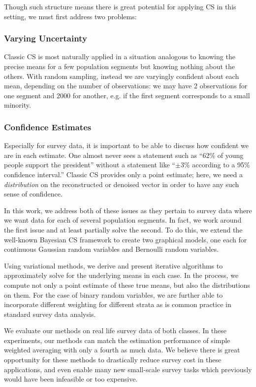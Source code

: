 Though such structure means there is great potential for applying CS in this setting, we must first address two problems:
\subsubsection{Varying Uncertainty}
Classic CS is most naturally applied in a situation analogous to knowing the precise means for a few population segments but knowing nothing about the others. With random sampling, instead we are varyingly confident about each mean, depending on the number of observations: we may have 2 observations for one segment and 2000 for another, e.g. if the first segment corresponds to a small minority.

\subsubsection{Confidence Estimates}
Especially for survey data, it is important to be able to discuss how confident we are in each estimate. One almost never sees a statement such as ``62\% of young people support the president'' without a statement like ``$\pm 3\%$ according to a 95\% confidence interval.'' Classic CS provides only a point estimate; here, we need a \emph{distribution} on the reconstructed or denoised vector in order to have any such sense of confidence.

In this work, we address both of these issues as they pertain to survey data where we want data for each of several population segments.
In fact, we work around the first issue and at least partially solve the second. 
To do this, we extend the well-known Bayesian CS framework \cite{ji2008bcs} to create two graphical models, one each for continuous Gaussian random variables and Bernoulli random variables.

Using variational methods, we derive and present iterative algorithms to approximately solve for the underlying means in each case.
In the process, we compute not only a point estimate of these true means, but also the distributions on them.
For the case of binary random variables, we are further able to incorporate different weighting for different strata as is common practice in standard survey data analysis.

We evaluate our methods on real life survey data of both classes.
In these experiments, our methods can match the estimation performance of simple weighted averaging with only a fourth as much data.
We believe there is great opportunity for these methods to drastically reduce survey cost in these applications, and even enable many new small-scale survey tasks which previously would have been infeasible or too expensive.


